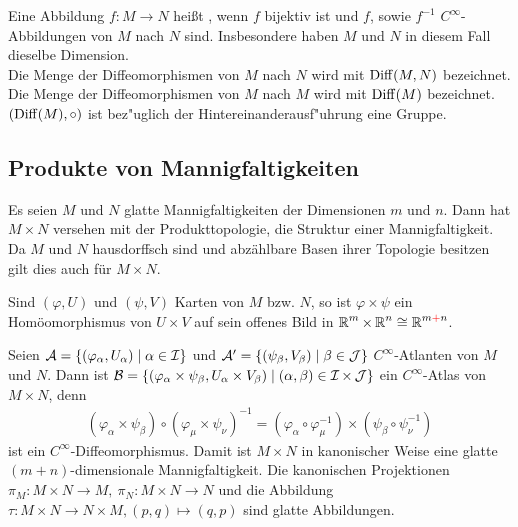 \begin{dfn}[Diffeomorphismus]
  Eine Abbildung $f \colon M \to N$ hei\ss t , wenn $f$ bijektiv ist und $f$, sowie $f^{-1}$ $C^{\infty}$-Abbildungen von $M$ nach $N$ sind. Insbesondere haben $M$ und $N$ in diesem Fall dieselbe Dimension.\\

Die Menge der Diffeomorphismen von $M$ nach $N$ wird mit $\operatorname{Diff}(M,N)$ bezeichnet. Die Menge der Diffeomorphismen von $M$ nach $M$ wird mit $\operatorname{Diff}(M)$ bezeichnet. $(\operatorname{Diff}(M), \circ)$ ist bez"uglich der Hintereinanderausf"uhrung eine Gruppe.

\end{dfn}



\subsection{Produkte von Mannigfaltigkeiten}

Es seien $M$ und $N$ glatte Mannigfaltigkeiten der Dimensionen $m$ und $n$. Dann hat $M \times N$ versehen mit der Produkttopologie, die Struktur einer Mannigfaltigkeit. Da $M$ und $N$ hausdorffsch sind und abzählbare Basen ihrer Topologie besitzen gilt dies auch für $M \times N$.

Sind $(\varphi, U)$ und $(\psi, V)$ Karten von $M$ bzw. $N$, so ist $\varphi \times \psi$ ein Homöomorphismus von $U \times V$ auf sein offenes Bild in $\operatorname{\mathbb{R}}^m \times \operatorname{\mathbb{R}}^n \cong \operatorname{\mathbb{R}}^{m \textcolor{red}{+} n}$.

Seien $\mathcal A = \{(\varphi_{\alpha}, U_{\alpha}) \mid \alpha \in \operatorname{\mathcal{I}} \}$ und $\mathcal A' = \{(\psi_{\beta}, V_{\beta}) \mid \beta \in \operatorname{\mathcal{J}}\}$ $C^{\infty}$-Atlanten von $M$ und $N$. Dann ist $\mathcal B = \{(\varphi_{\alpha}\times\psi_{\beta},U_{\alpha}\times V_{\beta}) \mid (\alpha, \beta) \in \operatorname{\mathcal{I}} \times \operatorname{\mathcal{J}}\}$ ein $C^{\infty}$-Atlas von $M\times N$, denn 
\begin{align*}
  (\varphi_{\alpha} \times \psi_{\beta}) \circ (\varphi_{\mu} \times \psi_{\nu})^{-1} = (\varphi_{\alpha} \circ \varphi_{\mu}^{-1}) \times (\psi_{\beta} \circ \psi_{\nu}^{-1})
\end{align*}
ist ein $C^{\infty}$-Diffeomorphismus. Damit ist $M\times N$ in kanonischer Weise eine glatte $(m+n)$-dimensionale Mannigfaltigkeit. Die kanonischen Projektionen $\pi_M\colon M\times N \to M, \ \pi_N\colon M \times N \to N$ und die Abbildung $\tau \colon M \times N \to N \times M, (p,q) \mapsto (q,p)$ sind glatte Abbildungen.

